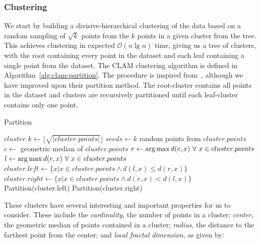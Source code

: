 \subsubsection{Clustering}
\label{subsubsec:methods:clam:clustering}

We start by building a divisive-hierarchical clustering of the data based on a random sampling of $\sqrt k$ points from the  $k$ points in a given cluster from the tree.
This achieves clustering in expected $\mathcal{O}(n \lg n)$ time, giving us a tree of clusters, with the root containing every point in the dataset and each leaf containing a single point from the dataset.
The CLAM clustering algorithm is defined in Algorithm~\ref{alg:clam-partition}.
The procedure is inspired from~\cite{ishaq2019clustered}, although we have improved upon their partition method.
The root-cluster contains all points in the dataset and clusters are recursively partitioned until each leaf-cluster contains only one point.

\begin{algorithm} %
\caption{Partition} %
\label{alg:clam-partition} %
\begin{algorithmic}[1] %
    \REQUIRE $cluster$
    \STATE $k \leftarrow \lfloor \sqrt{|cluster.points|} \rfloor$
    \STATE $seeds \leftarrow k$ random points from $cluster.points$
    \STATE $c \leftarrow$ geometric median of $cluster.points$
    \STATE $r \leftarrow \operatorname*{arg\,max} d(c,x) \ \forall \ x \in cluster.points$
    \STATE $l \leftarrow \operatorname*{arg\,max} d(r,x) \ \forall \ x \in cluster.points$
    \STATE $cluster.left \leftarrow \{x | x \in cluster.points \land d(l,x) \le d(r,x)\}$
    \STATE $cluster.right \leftarrow \{x | x \in cluster.points \land d(r,x) < d(l,x)\}$
        \STATE Partition(cluster.left)
    \ENDIF
        \STATE Partition(cluster.right)
    \ENDIF
\end{algorithmic}
\end{algorithm}

These clusters have several interesting and important properties for us to consider.
These include the \textit{cardinality}, the number of points in a cluster;
\textit{center}, the geometric median of points contained in a cluster;
\textit{radius}, the distance to the farthest point from the center;
and \textit{local fractal dimension},
as given by:

